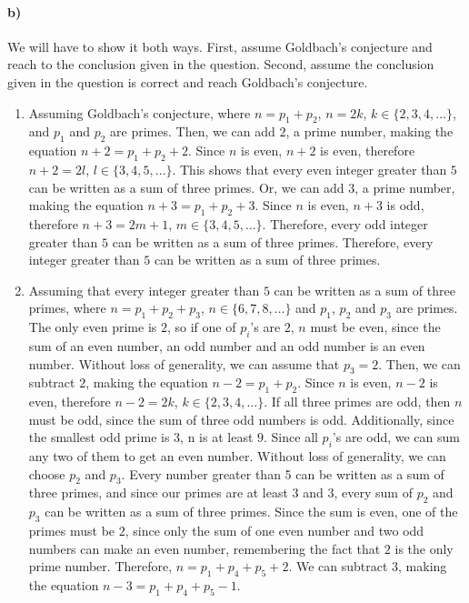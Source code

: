 \documentclass[12pt]{article}
\newcommand\+{\mkern2mu}
\begin{document}
\paragraph{b)}
We will have to show it both ways.
First, assume Goldbach's conjecture and reach to the conclusion given in the question.
Second, assume the conclusion given in the question is correct and reach Goldbach's conjecture.
\begin{enumerate}
\item Assuming Goldbach's conjecture, where $n = p_1 + p_2$, $n = 2k$, $k \in \{2, 3, 4, \dotso\}$, and $p_1$ and $p_2$ are primes.
Then, we can add $2$, a prime number, making the equation $n + 2 = p_1 + p_2 + 2$.
Since $n$ is even, $n + 2$ is even, therefore $n + 2 = 2l$, $l \in \{3, 4, 5, \dotso\}$.
This shows that every even integer greater than $5$ can be written as a sum of three primes.
Or, we can add $3$, a prime number, making the equation $n + 3 = p_1 + p_2 + 3$.
Since $n$ is even, $n + 3$ is odd, therefore $n + 3 = 2m + 1$, $m \in \{3, 4, 5, \dotso\}$.
Therefore, every odd integer greater than $5$ can be written as a sum of three primes.
Therefore, every integer greater than $5$ can be written as a sum of three primes.
\item Assuming that every integer greater than $5$ can be written as a sum of three primes, where $n = p_1 + p_2 + p_3$, $n \in \{6, 7, 8, \dotso\}$ and $p_1$, $p_2$ and $p_3$ are primes.
The only even prime is $2$, so if one of $p_i$'s are $2$, $n$ must be even, since the sum of an even number, an odd number and an odd number is an even number.
Without loss of generality, we can assume that $p_3 = 2$.
Then, we can subtract $2$, making the equation $n - 2 = p_1 + p_2$.
Since $n$ is even, $n - 2$ is even, therefore $n - 2 = 2k$, $k \in \{2, 3, 4, \dotso\}$.
If all three primes are odd, then $n$ must be odd, since the sum of three odd numbers is odd.
Additionally, since the smallest odd prime is $3$, n is at least $9$.
Since all $p_i$'s are odd, we can sum any two of them to get an even number.
Without loss of generality, we can choose $p_2$ and $p_3$.
Every number greater than 5 can be written as a sum of three primes, and since our primes are at least $3$ and $3$, every sum of $p_2$ and $p_3$ can be written as a sum of three primes.
Since the sum is even, one of the primes must be $2$, since only the sum of one even number and two odd numbers can make an even number, remembering the fact that $2$ is the only prime number.
Therefore, $n = p_1 + p_4 + p_5 + 2$.
We can subtract $3$, making the equation $n - 3 = p_1 + p_4 + p_5 - 1$.
\end{enumerate}
\end{document}
